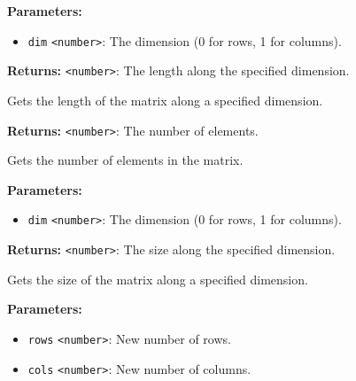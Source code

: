 \documentclass[12pt,a4paper]{article}
\begin{document}
\vspace{5mm}
\noindent {}


\noindent \textbf{Parameters:}
\begin{itemize}
  \item \texttt{dim} \texttt{<number>}: The dimension (0 for rows, 1 for columns).
\end{itemize}

\noindent \textbf{Returns:} \texttt{<number>}: The length along the specified dimension.

\noindent Gets the length of the matrix along a specified dimension.

\vspace{5mm}
\noindent {}


\noindent \textbf{Returns:} \texttt{<number>}: The number of elements.

\noindent Gets the number of elements in the matrix.

\vspace{5mm}
\noindent {}


\noindent \textbf{Parameters:}
\begin{itemize}
  \item \texttt{dim} \texttt{<number>}: The dimension (0 for rows, 1 for columns).
\end{itemize}

\noindent \textbf{Returns:} \texttt{<number>}: The size along the specified dimension.

\noindent Gets the size of the matrix along a specified dimension.

\vspace{5mm}
\noindent {}


\noindent \textbf{Parameters:}
\begin{itemize}
  \item \texttt{rows} \texttt{<number>}: New number of rows.
  \item \texttt{cols} \texttt{<number>}: New number of columns.
\end{itemize}
\end{document}
